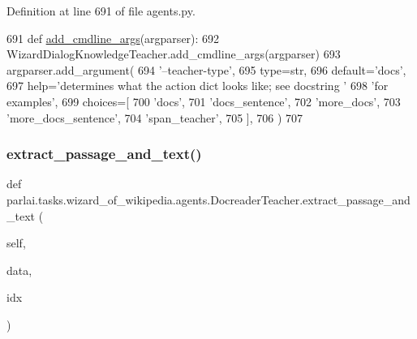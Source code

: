 Definition at line 691 of file agents.\+py.


\begin{DoxyCode}
691     \textcolor{keyword}{def }\hyperlink{namespaceparlai_1_1agents_1_1drqa_1_1config_a62fdd5554f1da6be0cba185271058320}{add\_cmdline\_args}(argparser):
692         WizardDialogKnowledgeTeacher.add\_cmdline\_args(argparser)
693         argparser.add\_argument(
694             \textcolor{stringliteral}{'--teacher-type'},
695             type=str,
696             default=\textcolor{stringliteral}{'docs'},
697             help=\textcolor{stringliteral}{'determines what the action dict looks like; see docstring '}
698             \textcolor{stringliteral}{'for examples'},
699             choices=[
700                 \textcolor{stringliteral}{'docs'},
701                 \textcolor{stringliteral}{'docs\_sentence'},
702                 \textcolor{stringliteral}{'more\_docs'},
703                 \textcolor{stringliteral}{'more\_docs\_sentence'},
704                 \textcolor{stringliteral}{'span\_teacher'},
705             ],
706         )
707 
\end{DoxyCode}
\mbox{\label{classparlai_1_1tasks_1_1wizard__of__wikipedia_1_1agents_1_1DocreaderTeacher_ae91935a6b1c7e904a125d8e4a9033407}} 
\subsubsection{\texorpdfstring{extract\+\_\+passage\+\_\+and\+\_\+text()}{extract\_passage\_and\_text()}}
{\footnotesize\ttfamily def parlai.\+tasks.\+wizard\+\_\+of\+\_\+wikipedia.\+agents.\+Docreader\+Teacher.\+extract\+\_\+passage\+\_\+and\+\_\+text (\begin{DoxyParamCaption}\item[{}]{self,  }\item[{}]{data,  }\item[{}]{idx }\end{DoxyParamCaption})}



